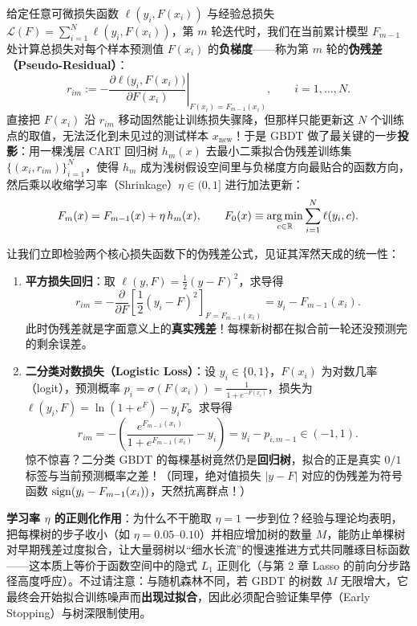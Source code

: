给定任意可微损失函数 $\ell(y_i, F(x_i))$ 与经验总损失 $\mathcal{L}(F) = \sum_{i=1}^N \ell(y_i, F(x_i))$，第 $m$ 轮迭代时，我们在当前累计模型 $F_{m-1}$ 处计算总损失对每个样本预测值 $F(x_i)$ 的\textbf{负梯度}——称为第 $m$ 轮的\textbf{伪残差（Pseudo-Residual）}：
\begin{equation}\label{eq:gbdt-pseudores}
  r_{im} := -\left.\frac{\partial \ell\big(y_i, F(x_i)\big)}{\partial F(x_i)}\right|_{F(x_i) = F_{m-1}(x_i)}, \qquad i = 1, \dots, N.
\end{equation}
直接把 $F(x_i)$ 沿 $r_{im}$ 移动固然能让训练损失骤降，但那样只能更新这 $N$ 个训练点的取值，无法泛化到未见过的测试样本 $x_{\text{new}}$！于是 GBDT 做了最关键的一步\textbf{投影}：用一棵浅层 CART 回归树 $h_m(x)$ 去最小二乘拟合伪残差训练集 $\{(x_i, r_{im})\}_{i=1}^N$，使得 $h_m$ 成为浅树假设空间里与负梯度方向最贴合的函数方向，然后乘以收缩学习率（Shrinkage）$\eta \in (0, 1]$ 进行加法更新：
\begin{equation}\label{eq:gbdt-update}
  F_m(x) = F_{m-1}(x) + \eta\, h_m(x), \qquad F_0(x) \equiv \operatorname*{arg\,min}_{c \in \mathbb{R}} \sum_{i=1}^{N} \ell(y_i, c).
\end{equation}

让我们立即检验两个核心损失函数下的伪残差公式，见证其浑然天成的统一性：
\begin{enumerate}
  \item \textbf{平方损失回归}：取 $\ell(y, F) = \frac{1}{2}(y - F)^2$，求导得
  \[
    r_{im} = -\frac{\partial}{\partial F}\left[\frac{1}{2}(y_i - F)^2\right]_{F=F_{m-1}(x_i)} = y_i - F_{m-1}(x_i).
  \]
  此时伪残差就是字面意义上的\textbf{真实残差}！每棵新树都在拟合前一轮还没预测完的剩余误差。
  \item \textbf{二分类对数损失（Logistic Loss）}：设 $y_i \in \{0, 1\}$，$F(x_i)$ 为对数几率（logit），预测概率 $p_i = \sigma(F(x_i)) = \frac{1}{1+e^{-F(x_i)}}$，损失为 $\ell(y_i, F) = \ln(1 + e^F) - y_i F$。求导得
  \[
    r_{im} = -\left(\frac{e^{F_{m-1}(x_i)}}{1 + e^{F_{m-1}(x_i)}} - y_i\right) = y_i - p_{i, m-1} \in (-1, 1).
  \]
  惊不惊喜？二分类 GBDT 的每棵基树竟然仍是\textbf{回归树}，拟合的正是真实 $0/1$ 标签与当前预测概率之差！（同理，绝对值损失 $|y-F|$ 对应的伪残差为符号函数 $\operatorname{sign}(y_i - F_{m-1}(x_i))$，天然抗离群点！）
\end{enumerate}

\textbf{学习率 $\eta$ 的正则化作用}：为什么不干脆取 $\eta = 1$ 一步到位？经验与理论均表明，把每棵树的步子收小（如 $\eta = 0.05\text{--}0.10$）并相应增加树的数量 $M$，能防止单棵树对早期残差过度拟合，让大量弱树以“细水长流”的慢速推进方式共同雕琢目标函数——这本质上等价于函数空间中的隐式 $L_1$ 正则化（与第 2 章 Lasso 的前向分步路径高度呼应）。不过请注意：与随机森林不同，若 GBDT 的树数 $M$ 无限增大，它最终会开始拟合训练噪声而\textbf{出现过拟合}，因此必须配合验证集早停（Early Stopping）与树深限制使用。


